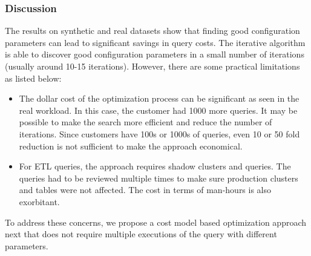 \subsubsection*{Discussion}
The results on synthetic and real datasets show that finding good configuration parameters can lead to significant savings in query costs. The iterative algorithm is able to discover good configuration parameters in a small number of iterations (usually around 10-15 iterations). However, there are some practical limitations as listed below:
\begin{itemize}
	\item The dollar cost of the optimization process can be significant as seen in the real workload. In this case, the customer had 1000 more queries. It may be possible to make the search more efficient and reduce the number of iterations. Since  customers have 100s or 1000s of queries, even 10 or 50 fold reduction is not sufficient to make the approach economical.
	\item For ETL queries, the approach requires shadow clusters and queries. The queries had to be reviewed multiple times to make sure production clusters and tables were not affected. The cost in terms of man-hours is also exorbitant. 	
\end{itemize} 
To address these concerns, we propose a cost model based optimization approach next that does not require multiple executions of the query with different parameters.